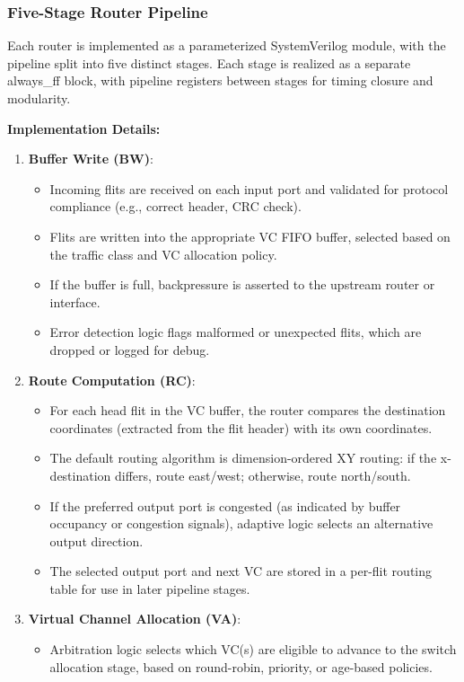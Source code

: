 \documentclass[11pt,a4paper]{article}
\begin{document}
\subsubsection{Five-Stage Router Pipeline}

Each router is implemented as a parameterized SystemVerilog module, with the pipeline split into five distinct stages. Each stage is realized as a separate always\_ff block, with pipeline registers between stages for timing closure and modularity.

\textbf{Implementation Details:}
\begin{enumerate}
    \item \textbf{Buffer Write (BW)}:
    \begin{itemize}
        \item Incoming flits are received on each input port and validated for protocol compliance (e.g., correct header, CRC check).
        \item Flits are written into the appropriate VC FIFO buffer, selected based on the traffic class and VC allocation policy.
        \item If the buffer is full, backpressure is asserted to the upstream router or interface.
        \item Error detection logic flags malformed or unexpected flits, which are dropped or logged for debug.
    \end{itemize}
    \item \textbf{Route Computation (RC)}:
    \begin{itemize}
        \item For each head flit in the VC buffer, the router compares the destination coordinates (extracted from the flit header) with its own coordinates.
        \item The default routing algorithm is dimension-ordered XY routing: if the x-destination differs, route east/west; otherwise, route north/south.
        \item If the preferred output port is congested (as indicated by buffer occupancy or congestion signals), adaptive logic selects an alternative output direction.
        \item The selected output port and next VC are stored in a per-flit routing table for use in later pipeline stages.
    \end{itemize}
    \item \textbf{Virtual Channel Allocation (VA)}:
    \begin{itemize}
        \item Arbitration logic selects which VC(s) are eligible to advance to the switch allocation stage, based on round-robin, priority, or age-based policies.

\end{itemize}
\end{enumerate}
\end{document}
